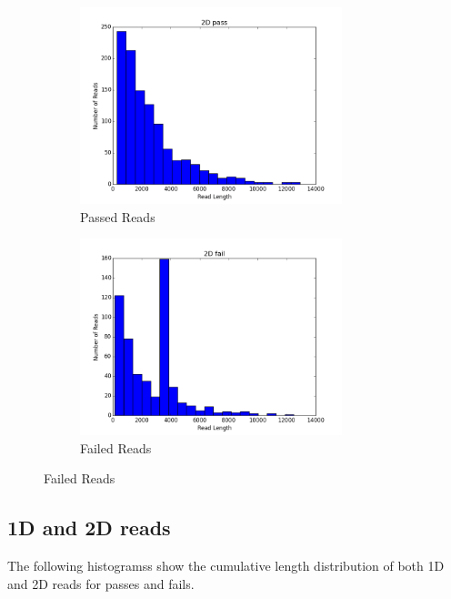         \begin{figure}[h!]
		\begin{subfigure}[b]{0.45\textwidth}
    			\includegraphics[width=3in]{2Dpasses}
    			\caption{Passed Reads}
  		\end{subfigure}
  		\begin{subfigure}[b]{0.45\textwidth}
    			\includegraphics[width=3in]{2Dfailures}
    			\caption{Failed Reads}
  		\end{subfigure}
	\end{figure}

        
\subsection*{1D and 2D reads}

        The following histogramss show the cumulative length distribution of both 1D and 2D reads for passes and fails.

